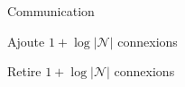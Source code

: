 \begin{frame}{Communication}{\SPRAY}
  \begin{minipage}{0.32\textwidth}
    \begin{center}
      \small Ajoute $1+\log |\mathcal{N}|$ connexions
    \end{center}
  \end{minipage}
  \begin{minipage}{0.32\textwidth}
    \begin{center}
    \end{center}
  \end{minipage}
  \begin{minipage}{0.32\textwidth}
    \begin{center}
      \small Retire $1+\log |\mathcal{N}|$ connexions
    \end{center}
  \end{minipage}




\end{frame}



